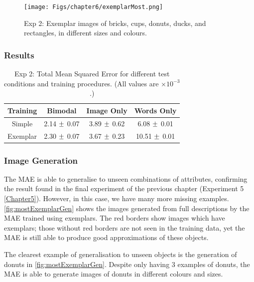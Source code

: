 \begin{figure}[ht]
    \centering
    \texttt{[image: Figs/chapter6/exemplarMost.png]}
    \caption{Exp 2: Exemplar images of bricks, cups, donuts, ducks, and rectangles, in different sizes and colours.}
    \label{fig:ExmMost}
\end{figure}


\subsubsection{Results}

\begin{table}[h!]
\centering
	\begin{tabular}{|c|c|c|c|}
	\hline
\textbf{Training} & 	\textbf{Bimodal} & 	\textbf{Image Only} 	& 	\textbf{Words Only} \\ \hline
Simple &  2.14 $\mypm$	0.07 & 3.89 $\mypm$	0.62 & 6.08 $\mypm$ 0.01 \\ \hline
Exemplar & 2.30 $\mypm$ 0.07 & 3.67 $\mypm$ 0.23
& 10.51	$\mypm$ 0.01 \\ \hline

\end{tabular}
\caption{Exp 2: Total Mean Squared Error for different test conditions and training procedures. (All values are $\times10^{-3}$.)}
\label{tab:6_res_exp2}
\end{table}


\subsubsection{Image Generation}
The \ac{MAE} is able to generalise to unseen combinations of attributes, confirming the result found in the final experiment of the previous chapter (Experiment 5 \autoref{Chapter5}). However, in this case, we have many more missing examples. \autoref{fig:mostExemplarGen} shows the images generated from full descriptions by the \ac{MAE} trained using exemplars. The red borders show images which have exemplars; those without red borders are not seen in the training data, yet the \ac{MAE} is still able to produce good approximations of these objects.

The clearest example of generalisation to unseen objects is the generation of donuts in \autoref{fig:mostExemplarGen}. Despite only having 3 examples of donuts, the \ac{MAE} is able to generate images of donuts in different colours and sizes.  

